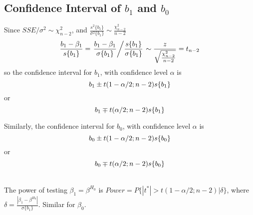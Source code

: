 \documentclass{article}
\begin{document}
\subsection{Confidence Interval of $b_1$ and $b_0$}
Since $SSE/\sigma^2 \sim \chi_{n-2}^2$, and $\frac{s^2\{b_1\}}{\sigma^2\{b_1\}} \sim \frac{\chi_{n-2}^2}{n-2}$
\begin{eqnarray}
	\frac{b_1-\beta_1}{s\{b_1\}} = \left. \frac{b_1-\beta_1}{\sigma\{b_1\}} \middle/ \frac{s\{b_1\}}{\sigma\{b_1\}} \right. \sim \frac{z}{\sqrt{\frac{\chi_{n-2}^2}{n-2}}} = t_{n-2}
\end{eqnarray}
so the confidence interval for $b_1$, with confidence level $\alpha$ is
\begin{equation}
	b_1 \pm t(1-\alpha/2;n-2)s\{b_1\}\\
\end{equation}
or
\begin{equation}
	b_1 \mp t(\alpha/2;n-2)s\{b_1\}\\
\end{equation}

Similarly, the confidence interval for $b_0$, with confidence level $\alpha$ is
\begin{equation}
	b_0 \pm t(1-\alpha/2;n-2)s\{b_0\}\\
\end{equation}
or
\begin{equation}
	b_0 \mp t(\alpha/2;n-2)s\{b_0\}\\
\end{equation}

\noindent
\\
The power of testing $\beta_1 = \beta^{H_0}$ is $Power = P\{|t^*|>t(1-\alpha/2;n-2)|\delta\}$, where $\delta = \frac{|\beta_1 - \beta^{H_0}|}{\sigma\{b_1\}}$. Similar for $\beta_0$.
\end{document}
